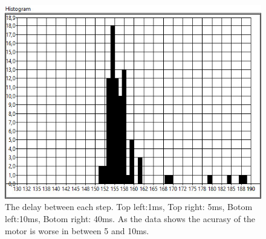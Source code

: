 \begin{figure}[ht]
        \includegraphics[scale=0.2] {./mesurment/data/Expected_160,0__Mean_156,97__Distrubution_6,850402_Rotating_40ms}
  \caption{The delay between each step. Top left:1ms, Top right: 5ms, Botom left:10ms, Botom right: 40ms. As the data shows the acurasy of the motor is worse in between 5 and 10ms.}
  \label{fig:test-hist}
\end{figure}

